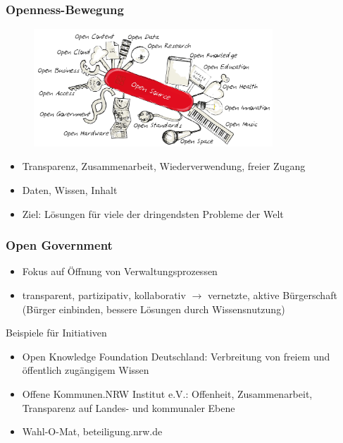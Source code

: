 \subsubsection{Openness-Bewegung}

\begin{figure}[h]
\centering
\includegraphics[width=0.8\textwidth]{assets/Open.png}
\end{figure}

\begin{itemize}
  \item Transparenz, Zusammenarbeit, Wiederverwendung, freier Zugang
  \item Daten, Wissen, Inhalt
  \item Ziel: Lösungen für viele der dringendsten Probleme der Welt
\end{itemize}

\subsubsection{Open Government}

\begin{itemize}
  \item Fokus auf Öffnung von Verwaltungsprozessen
  \item transparent, partizipativ, kollaborativ $\rightarrow$ vernetzte, aktive Bürgerschaft (Bürger einbinden, bessere Lösungen durch Wissensnutzung)
\end{itemize}

Beispiele für Initiativen

\begin{itemize}
  \item Open Knowledge Foundation Deutschland: Verbreitung von freiem und öffentlich zugängigem Wissen
  \item Offene Kommunen.NRW Institut e.V.: Offenheit, Zusammenarbeit, Transparenz auf Landes- und kommunaler Ebene
  \item Wahl-O-Mat, beteiligung.nrw.de
\end{itemize}

